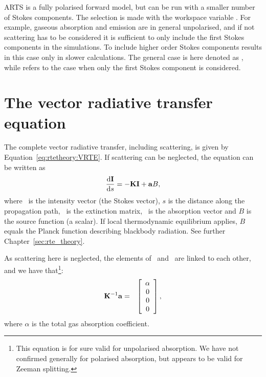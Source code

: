 ARTS is a fully polarised forward model, but can be run with a smaller
number of Stokes components. The selection is made with the workspace
variable . For example, gaseous absorption and
emission are in general unpolarised, and if not scattering has to be
considered it is sufficient to only include the first Stokes
components in the simulations. To include higher order Stokes
components results in this case only in slower calculations. The
general case is here denoted as ,
while  refers to the case when
only the first Stokes component is considered.



\section{The vector radiative transfer equation}
\label{sec:rte:vrte}

The complete vector radiative transfer, including scattering, is given
by Equation~\ref{eq:rtetheory:VRTE}. If scattering can be neglected,
the equation can be written as
\begin{equation}
  \label{eq:rte:vrte}
  \frac {\mathrm{d}{\bf I}}{\mathrm{d} s} = -{\bf K}{\bf I} + {\bf a} B,
\end{equation}
where \StoVec\ is the intensity vector (the Stokes vector), $s$ is the
distance along the propagation path, \ExtMat\ is the extinction
matrix, \AbsVec\ is the absorption vector and $B$ is the source
function (a scalar). If local thermodynamic equilibrium applies, $B$
equals the Planck function describing blackbody radiation. See further
Chapter~\ref{sec:rte_theory}.

As scattering here is neglected, the elements of \ExtMat\ and \AbsVec\ 
are linked to each other, and we have that\footnote{This equation is
  for sure valid for unpolarised absorption. We have not confirmed
  generally for polarised absorption, but appears to be valid for
  Zeeman splitting.}:
\begin{eqnarray*}
  {\bf K}^{-1}{\bf a} &=& \left[\begin{array}{c} \alpha\\0\\0\\0 \end{array}\right],
\end{eqnarray*}
where $\alpha$ is the total gas absorption coefficient. 



